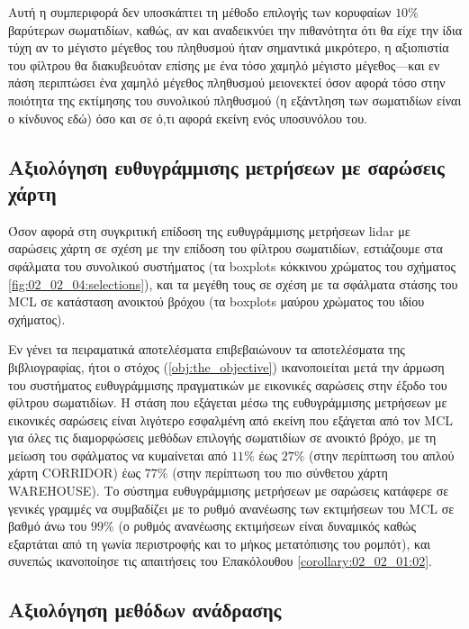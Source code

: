 Αυτή η συμπεριφορά δεν υποσκάπτει τη μέθοδο επιλογής των κορυφαίων $10\%$
βαρύτερων σωματιδίων, καθώς, αν και αναδεικνύει την πιθανότητα ότι θα είχε την
ίδια τύχη αν το μέγιστο μέγεθος του πληθυσμού ήταν σημαντικά μικρότερο, η
αξιοπιστία του φίλτρου θα διακυβευόταν επίσης με ένα τόσο χαμηλό μέγιστο
μέγεθος---και εν πάση περιπτώσει ένα χαμηλό μέγεθος πληθυσμού μειονεκτεί όσον
αφορά τόσο στην ποιότητα της εκτίμησης του συνολικού πληθυσμού (η εξάντληση των
σωματιδίων είναι ο κίνδυνος εδώ) όσο και σε ό,τι αφορά εκείνη ενός υποσυνόλου
του.


\subsection{Αξιολόγηση ευθυγράμμισης μετρήσεων με σαρώσεις χάρτη}
\label{subsection:02_02_04:04}

Όσον αφορά στη συγκριτική επίδοση της ευθυγράμμισης μετρήσεων lidar με σαρώσεις
χάρτη σε σχέση με την επίδοση του φίλτρου σωματιδίων, εστιάζουμε στα σφάλματα
του συνολικού συστήματος (τα boxplots κόκκινου χρώματος του σχήματος
\ref{fig:02_02_04:selections}), και τα μεγέθη τους σε σχέση με τα σφάλματα
στάσης του MCL σε κατάσταση ανοικτού βρόχου (τα boxplots μαύρου χρώματος του
ιδίου σχήματος).

Εν γένει τα πειραματικά αποτελέσματα επιβεβαιώνουν τα αποτελέσματα της
βιβλιογραφίας, ήτοι ο στόχος (\ref{obj:the_objective}) ικανοποιείται μετά την
άρμωση του συστήματος ευθυγράμμισης πραγματικών με εικονικές σαρώσεις στην
έξοδο του φίλτρου σωματιδίων. Η στάση που εξάγεται μέσω της ευθυγράμμισης
μετρήσεων με εικονικές σαρώσεις είναι λιγότερο εσφαλμένη από εκείνη που
εξάγεται από τον MCL για όλες τις διαμορφώσεις μεθόδων επιλογής σωματιδίων σε
ανοικτό βρόχο, με τη μείωση του σφάλματος να κυμαίνεται από $11\%$ έως $27\%$
(στην περίπτωση του απλού χάρτη CORRIDOR) έως $77\%$ (στην περίπτωση του πιο
σύνθετου χάρτη WAREHOUSE). Το σύστημα ευθυγράμμισης μετρήσεων με σαρώσεις
κατάφερε σε γενικές γραμμές να συμβαδίζει με το ρυθμό ανανέωσης των εκτιμήσεων
του MCL σε βαθμό άνω του $99\%$ (ο ρυθμός ανανέωσης εκτιμήσεων είναι δυναμικός
καθώς εξαρτάται από τη γωνία περιστροφής και το μήκος μετατόπισης του ρομπότ),
και συνεπώς ικανοποίησε τις απαιτήσεις του Επακόλουθου
\ref{corollary:02_02_01:02}.

\subsection{Αξιολόγηση μεθόδων ανάδρασης}
\label{subsection:02_02_04:05}

